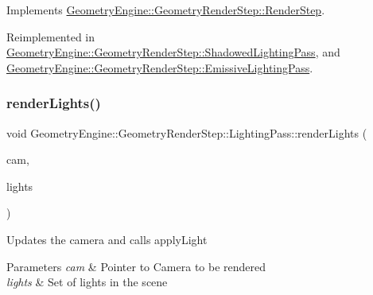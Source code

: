 Implements \mbox{\hyperlink{class_geometry_engine_1_1_geometry_render_step_1_1_render_step_a9b054ee8f38304319a9d03ba3e173dcd}{Geometry\+Engine\+::\+Geometry\+Render\+Step\+::\+Render\+Step}}.



Reimplemented in \mbox{\hyperlink{class_geometry_engine_1_1_geometry_render_step_1_1_shadowed_lighting_pass_af52807435083cd96125e6ef6d7453027}{Geometry\+Engine\+::\+Geometry\+Render\+Step\+::\+Shadowed\+Lighting\+Pass}}, and \mbox{\hyperlink{class_geometry_engine_1_1_geometry_render_step_1_1_emissive_lighting_pass_adffe18f64968290aedda426bc4450414}{Geometry\+Engine\+::\+Geometry\+Render\+Step\+::\+Emissive\+Lighting\+Pass}}.

\mbox{\label{class_geometry_engine_1_1_geometry_render_step_1_1_lighting_pass_a437ff10a7ef9e7529a4852389a5cf871}} 
\subsubsection{\texorpdfstring{renderLights()}{renderLights()}}
{\footnotesize\ttfamily void Geometry\+Engine\+::\+Geometry\+Render\+Step\+::\+Lighting\+Pass\+::render\+Lights (\begin{DoxyParamCaption}\item[{\mbox{\hyperlink{class_geometry_engine_1_1_geometry_world_item_1_1_geometry_camera_1_1_camera}{Geometry\+World\+Item\+::\+Geometry\+Camera\+::\+Camera}} $\ast$}]{cam,  }\item[{std\+::unordered\+\_\+set$<$ \mbox{\hyperlink{class_geometry_engine_1_1_geometry_world_item_1_1_geometry_light_1_1_light}{Geometry\+World\+Item\+::\+Geometry\+Light\+::\+Light}} $\ast$ $>$ $\ast$}]{lights }\end{DoxyParamCaption})\hspace{0.3cm}{\ttfamily [protected]}}

Updates the camera and calls apply\+Light 
\begin{DoxyParams}{Parameters}
{\em cam} & Pointer to Camera to be rendered \\
\hline
{\em lights} & Set of lights in the scene \\
\hline
\end{DoxyParams}
\mbox{\label{class_geometry_engine_1_1_geometry_render_step_1_1_lighting_pass_a42b7f335d4bebdbdd06c3bef142844c0}} 
